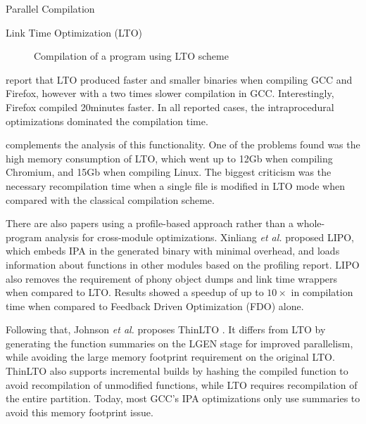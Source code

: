 \begin{section}{Parallel Compilation}
\begin{subsection}{Link Time Optimization (LTO)}
\begin{figure}
{{
}
}%
\caption{Compilation of a program using LTO scheme}
\label{fig:whopr_build}
\end{figure}

\cite{glek2010optimizing} report that LTO produced faster and smaller binaries when compiling GCC
and Firefox, however with a two times slower compilation in GCC. Interestingly,
Firefox compiled 20minutes faster. In all reported cases, the intraprocedural
optimizations dominated the compilation time.

\cite{livska2014optimizing} complements the analysis of this functionality. One
of the problems found was the high memory consumption of LTO, which went up to
12Gb when compiling Chromium, and 15Gb when compiling Linux. The biggest
criticism was the necessary recompilation time when a single file is modified
in LTO mode when compared with the classical compilation scheme.

There are also papers using a profile-based approach rather than a whole-program
analysis for cross-module optimizations.  Xinliang \textit{et al.}
\cite{lipo} proposed LIPO, which embeds IPA in the generated
binary with minimal overhead, and loads information about functions in other
modules based on the profiling report. LIPO also removes the requirement of
phony object dumps and link time wrappers when compared to LTO. Results showed
a speedup of up to $10\times$ in compilation time when compared to Feedback
Driven Optimization (FDO) alone.

Following that, Johnson \textit{et al.} proposes ThinLTO \cite{thinlto}. It
differs from LTO by generating the function summaries on the LGEN stage for
improved parallelism, while avoiding the large memory footprint requirement on the
original LTO. ThinLTO also supports incremental builds by hashing the compiled
function to avoid recompilation of unmodified functions, while LTO requires
recompilation of the entire partition. Today, most GCC's IPA
optimizations only use summaries to avoid this memory footprint issue.

\end{subsection}
\end{section}


